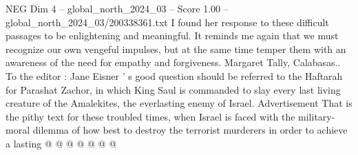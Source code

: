 \begin{textsample}{NEG Dim 4 – global\_north\_2024\_03 – Score 1.00 – global\_north\_2024\_03/200338361.txt}
I found her response to these difficult passages to be enlightening and meaningful.
It reminds me again that we must recognize our own vengeful impulses, but at the same time temper them with an awareness of the need for empathy and forgiveness.
Margaret Tally, Calabasas..
To the editor : Jane Eisner ' s good question should be referred to the Haftarah for Parashat Zachor, in which King Saul is commanded to slay every last living creature of the Amalekites, the everlasting enemy of Israel.
Advertisement That is the pithy text for these troubled times, when Israel is faced with the military-moral dilemma of how best to destroy the terrorist murderers in order to achieve a lasting @ @ @ @ @ @ @

\end{textsample}
